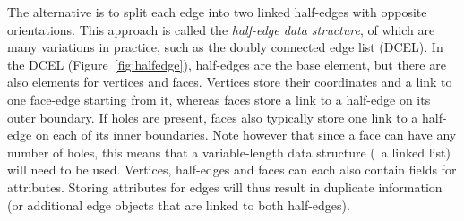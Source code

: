 The alternative is to split each edge into two linked half-edges with opposite orientations.
This approach is called the \emph{half-edge data structure}, of which are many variations in practice, such as the doubly connected edge list (DCEL).
In the DCEL (Figure~\ref{fig:halfedge}), half-edges are the base element, but there are also elements for vertices and faces.
Vertices store their coordinates and a link to one face-edge starting from it, whereas faces store a link to a half-edge on its outer boundary.
If holes are present, faces also typically store one link to a half-edge on each of its inner boundaries.
Note however that since a face can have any number of holes, this means that a variable-length data structure (\eg\ a linked list) will need to be used.
Vertices, half-edges and faces can each also contain fields for attributes.
Storing attributes for edges will thus result in duplicate information (or additional edge objects that are linked to both half-edges).

